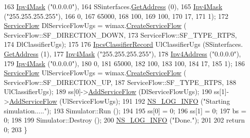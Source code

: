 \begin{DoxyCode}
163                                         \hyperlink{classns3_1_1Ipv4Mask}{Ipv4Mask} (\textcolor{stringliteral}{"0.0.0.0"}),
164                                         SSinterfaces.\hyperlink{classns3_1_1Ipv4InterfaceContainer_ae63208dcd222be986822937ee4aa828c}{GetAddress} (0),
165                                         \hyperlink{classns3_1_1Ipv4Mask}{Ipv4Mask} (\textcolor{stringliteral}{"255.255.255.255"}),
166                                         0,
167                                         65000,
168                                         100,
169                                         100,
170                                         17,
171                                         1);
172   \hyperlink{classns3_1_1ServiceFlow}{ServiceFlow} DlServiceFlowUgs = wimax.\hyperlink{classns3_1_1WimaxHelper_aed0c1ffdcd62234c14965f899efc88c1}{CreateServiceFlow} (
      ServiceFlow::SF\_DIRECTION\_DOWN,
173                                                           ServiceFlow::SF\_TYPE\_RTPS,
174                                                           DlClassifierUgs);
175 
176   \hyperlink{classns3_1_1IpcsClassifierRecord}{IpcsClassifierRecord} UlClassifierUgs (SSinterfaces.
      \hyperlink{classns3_1_1Ipv4InterfaceContainer_ae63208dcd222be986822937ee4aa828c}{GetAddress} (1),
177                                         \hyperlink{classns3_1_1Ipv4Mask}{Ipv4Mask} (\textcolor{stringliteral}{"255.255.255.255"}),
178                                         \hyperlink{classns3_1_1Ipv4Address}{Ipv4Address} (\textcolor{stringliteral}{"0.0.0.0"}),
179                                         \hyperlink{classns3_1_1Ipv4Mask}{Ipv4Mask} (\textcolor{stringliteral}{"0.0.0.0"}),
180                                         0,
181                                         65000,
182                                         100,
183                                         100,
184                                         17,
185                                         1);
186   \hyperlink{classns3_1_1ServiceFlow}{ServiceFlow} UlServiceFlowUgs = wimax.\hyperlink{classns3_1_1WimaxHelper_aed0c1ffdcd62234c14965f899efc88c1}{CreateServiceFlow} (
      ServiceFlow::SF\_DIRECTION\_UP,
187                                                           ServiceFlow::SF\_TYPE\_RTPS,
188                                                           UlClassifierUgs);
189   ss[0]->\hyperlink{classns3_1_1SubscriberStationNetDevice_af90b31dd4b3f4a52acdc195443c7138f}{AddServiceFlow} (DlServiceFlowUgs);
190   ss[1]->\hyperlink{classns3_1_1SubscriberStationNetDevice_af90b31dd4b3f4a52acdc195443c7138f}{AddServiceFlow} (UlServiceFlowUgs);
191 
192   \hyperlink{group__logging_gafbd73ee2cf9f26b319f49086d8e860fb}{NS\_LOG\_INFO} (\textcolor{stringliteral}{"Starting simulation....."});
193   Simulator::Run ();
194 
195   ss[0] = 0;
196   ss[1] = 0;
197   bs = 0;
198 
199   Simulator::Destroy ();
200   \hyperlink{group__logging_gafbd73ee2cf9f26b319f49086d8e860fb}{NS\_LOG\_INFO} (\textcolor{stringliteral}{"Done."});
201 
202   \textcolor{keywordflow}{return} 0;
203 \}
\end{DoxyCode}


